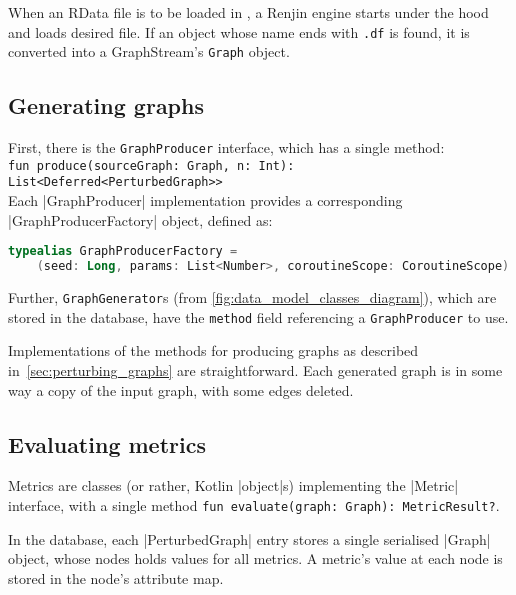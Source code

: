 When an RData file is to be loaded in \graffs, a Renjin engine starts under the hood and loads desired file.
If an object whose name ends with \texttt{.df}\footnotemark{} is found, it is converted into a GraphStream's \texttt{Graph} object.

\subsection{Generating graphs}

First, there is the \texttt{GraphProducer} interface, which has a single method\footnotemark{}:\\ \texttt{fun produce(sourceGraph: Graph, n: Int): List<Deferred<PerturbedGraph>>}
 \\
Each |GraphProducer| implementation provides a corresponding |GraphProducerFactory| object, defined as:
\begin{lstlisting}[language=Kotlin]
typealias GraphProducerFactory =
    (seed: Long, params: List<Number>, coroutineScope: CoroutineScope) -> GraphProducer
\end{lstlisting}

Further, \texttt{GraphGenerator}s (from \autoref{fig:data_model_classes_diagram}), which are stored in the database, have the \texttt{method} field referencing a \texttt{GraphProducer} to use.

Implementations of the methods for producing graphs as described in~\autoref{sec:perturbing_graphs} are straightforward.
Each generated graph is in some way a copy of the input graph, with some edges deleted.

\subsection{Evaluating metrics}

Metrics are classes (or rather, Kotlin |object|s) implementing the |Metric| interface, with a single method \texttt{fun evaluate(graph: Graph): MetricResult?}.

In the database, each |PerturbedGraph| entry stores a single serialised |Graph| object, whose nodes holds values for all metrics.
A metric's value at each node is stored in the node's attribute map.

